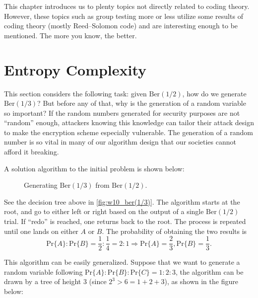This chapter introduces us to plenty topics not directly related to coding theory. However, these topics such as group testing more or less utilize some results of coding theory (mostly Reed--Solomon code) and are interesting enough to be mentioned. The more you know, the better.


\section{Entropy Complexity}

This section considers the following task: given $\mathrm{Ber}(1/2)$, how do we generate $\mathrm{Ber}(1/3)$? But before any of that, why is the generation of a random variable so important? If the random numbers generated for security purposes are not ``random'' enough, attackers knowing this knowledge can tailor their attack design to make the encryption scheme especially vulnerable. The generation of a random number is so vital in many of our algorithm design that our societies cannot afford it breaking.

A solution algorithm to the initial problem is shown below:

\begin{figure}[H]
    \centering
    \caption{Generating $\mathrm{Ber}(1/3)$ from $\mathrm{Ber}(1/2)$.}
    \label{fig:w10_ber(1/3)}
\end{figure}

See the decision tree above in \autoref{fig:w10_ber(1/3)}. The algorithm starts at the root, and go to either left or right based on the output of a single $\mathrm{Ber}(1/2)$ trial. If ``redo'' is reached, one returns back to the root. The process is repeated until one lands on either $A$ or $B$. The probability of obtaining the two results is
\begin{equation*}
    \mathrm{Pr}\{A\}:\mathrm{Pr}\{B\} = \frac{1}{2}:\frac{1}{4}=2:1 \Rightarrow \mathrm{Pr}\{A\} = \frac{2}{3}, \mathrm{Pr}\{B\}=\frac{1}{3}.
\end{equation*}

This algorithm can be easily generalized. Suppose that we want to generate a random variable following $\mathrm{Pr}\{A\}:\mathrm{Pr}\{B\}:\mathrm{Pr}\{C\} = 1:2:3$, the algorithm can be drawn by a tree of height 3 (since $2^3 > 6 = 1 + 2 + 3$), as shown in the figure below:

